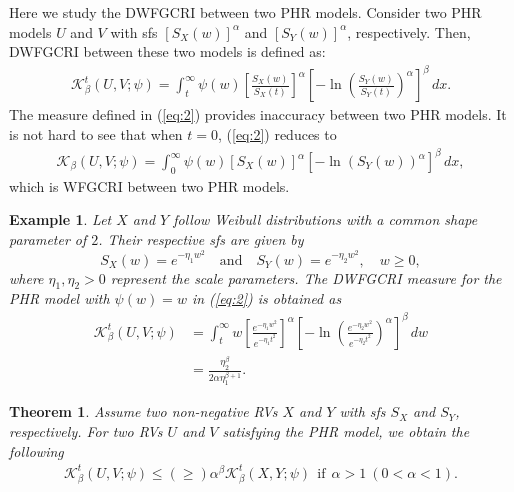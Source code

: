 \documentclass[12pt,a4paper]{article}
\numberwithin{equation}{section}
\newtheorem{theorem}{Theorem}[section]
\newtheorem{exe}{Example}[section]
\begin{document}
	Here we study the DWFGCRI between two PHR models. Consider two PHR models $U$ and $V$ with sfs $[S_X(w)]^\alpha$ and $[S_Y(w)]^\alpha$, respectively. Then, DWFGCRI between these two models is defined as:
	\begin{align}\label{eq:2}
		\mathcal K^t_\beta(U,V;\psi)=\int_t^\infty\psi(w)\left[\frac{S_X(w)}{S_X(t)}\right]^\alpha\left[-\ln\left(\frac{S_Y(w)}{S_Y(t)}\right)^\alpha\right]^\beta\,dx.
	\end{align}
	The measure defined in (\ref{eq:2}) provides inaccuracy between two PHR models. It is not hard to see that when $t= 0$, (\ref{eq:2}) reduces to
	\begin{align*}
		\mathcal K_\beta(U,V;\psi)=\int_0^\infty\psi(w)\left[{S_X(w)}{}\right]^\alpha\left[-\ln\left({S_Y(w)}{}\right)^\alpha\right]^\beta\,dx,
	\end{align*}which is WFGCRI between two PHR models.
	\begin{exe}
Let $X$ and $Y$ follow Weibull distributions with a common shape parameter of $2$. Their respective sfs are given by
\begin{equation*}
	S_X(w) = e^{-\eta_1 w^2} \quad \text{and} \quad S_Y(w) = e^{-\eta_2 w^2}, \quad w \geq 0,
\end{equation*}
where $\eta_1, \eta_2 > 0$ represent the scale parameters. The DWFGCRI measure for the PHR model with $\psi(w)=w$  in
		(\ref{eq:2}) is obtained as
		\begin{align*}
			\mathcal K^t_\beta(U,V;\psi)&=\int_t^\infty w\left[\frac{e^{-\eta_1 w^2}}{e^{-\eta_1 t^2}}\right]^\alpha\left[-\ln\left(\frac{e^{-\eta_2 w^2}}{e^{-\eta_2 t^2}}\right)^\alpha\right]^\beta\,dw\\
			&= \frac{\eta_2^\beta}{2 \alpha \eta_1^{\beta + 1}}.
		\end{align*}
	\end{exe}
\begin{theorem}
Assume two non-negative RVs $X$ and $Y$ with sfs $S_X$ and $S_Y$, respectively. For two RVs $U$ and $V$ satisfying the PHR model, we obtain the following
\begin{align*}
\mathcal{K}^t_\beta(U,V;\psi)\leq(\geq)\alpha^\beta\mathcal{K}^t_\beta(X,Y;\psi)~~\text{if}~~\alpha>1~(0<\alpha<1). 
\end{align*}
\end{theorem}
\end{document}
